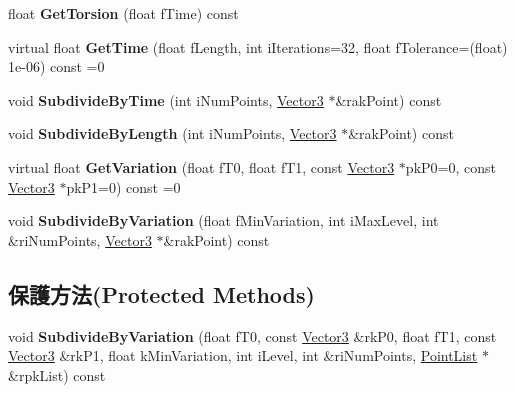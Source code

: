 \begin{DoxyCompactItemize}
\item 
float {\bfseries Get\+Torsion} (float f\+Time) const \hypertarget{class_i_dream_sky_1_1_curve3_af945b6947220118911b4e1c356d4bac0}{}\label{class_i_dream_sky_1_1_curve3_af945b6947220118911b4e1c356d4bac0}

\item 
virtual float {\bfseries Get\+Time} (float f\+Length, int i\+Iterations=32, float f\+Tolerance=(float) 1e-\/06) const  =0\hypertarget{class_i_dream_sky_1_1_curve3_a8d6f82a197eeb45ca49d76b86d143842}{}\label{class_i_dream_sky_1_1_curve3_a8d6f82a197eeb45ca49d76b86d143842}

\item 
void {\bfseries Subdivide\+By\+Time} (int i\+Num\+Points, \hyperlink{class_i_dream_sky_1_1_vector3}{Vector3} $\ast$\&rak\+Point) const \hypertarget{class_i_dream_sky_1_1_curve3_af7fd55200aaf9ce373eee7dadbf2a17c}{}\label{class_i_dream_sky_1_1_curve3_af7fd55200aaf9ce373eee7dadbf2a17c}

\item 
void {\bfseries Subdivide\+By\+Length} (int i\+Num\+Points, \hyperlink{class_i_dream_sky_1_1_vector3}{Vector3} $\ast$\&rak\+Point) const \hypertarget{class_i_dream_sky_1_1_curve3_a3f5c3b1695a08c8db711bc86ba74ff92}{}\label{class_i_dream_sky_1_1_curve3_a3f5c3b1695a08c8db711bc86ba74ff92}

\item 
virtual float {\bfseries Get\+Variation} (float f\+T0, float f\+T1, const \hyperlink{class_i_dream_sky_1_1_vector3}{Vector3} $\ast$pk\+P0=0, const \hyperlink{class_i_dream_sky_1_1_vector3}{Vector3} $\ast$pk\+P1=0) const  =0\hypertarget{class_i_dream_sky_1_1_curve3_ade5aa47bcb125a273e3710e92f2bf641}{}\label{class_i_dream_sky_1_1_curve3_ade5aa47bcb125a273e3710e92f2bf641}

\item 
void {\bfseries Subdivide\+By\+Variation} (float f\+Min\+Variation, int i\+Max\+Level, int \&ri\+Num\+Points, \hyperlink{class_i_dream_sky_1_1_vector3}{Vector3} $\ast$\&rak\+Point) const \hypertarget{class_i_dream_sky_1_1_curve3_a1d6ad8bb581ddbb0e2acb5b3e770bf8e}{}\label{class_i_dream_sky_1_1_curve3_a1d6ad8bb581ddbb0e2acb5b3e770bf8e}

\end{DoxyCompactItemize}
\subsection*{保護方法(Protected Methods)}
\begin{DoxyCompactItemize}
\item 
void {\bfseries Subdivide\+By\+Variation} (float f\+T0, const \hyperlink{class_i_dream_sky_1_1_vector3}{Vector3} \&rk\+P0, float f\+T1, const \hyperlink{class_i_dream_sky_1_1_vector3}{Vector3} \&rk\+P1, float k\+Min\+Variation, int i\+Level, int \&ri\+Num\+Points, \hyperlink{class_i_dream_sky_1_1_curve3_1_1_point_list}{Point\+List} $\ast$\&rpk\+List) const \hypertarget{class_i_dream_sky_1_1_curve3_a4929186737be63760dacb20ba5979b56}{}\label{class_i_dream_sky_1_1_curve3_a4929186737be63760dacb20ba5979b56}

\end{DoxyCompactItemize}
